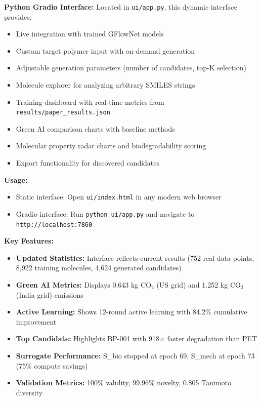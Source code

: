 \documentclass[twocolumn,10pt]{article}
\begin{document}
\textbf{Python Gradio Interface:} Located in \texttt{ui/app.py}, this dynamic interface provides:
\begin{itemize}[noitemsep,leftmargin=*]
\item Live integration with trained GFlowNet models
\item Custom target polymer input with on-demand generation
\item Adjustable generation parameters (number of candidates, top-K selection)
\item Molecule explorer for analyzing arbitrary SMILES strings
\item Training dashboard with real-time metrics from \texttt{results/paper\_results.json}
\item Green AI comparison charts with baseline methods
\item Molecular property radar charts and biodegradability scoring
\item Export functionality for discovered candidates
\end{itemize}

\textbf{Usage:}
\begin{itemize}[noitemsep,leftmargin=*]
\item Static interface: Open \texttt{ui/index.html} in any modern web browser
\item Gradio interface: Run \texttt{python ui/app.py} and navigate to \texttt{http://localhost:7860}
\end{itemize}

\textbf{Key Features:}
\begin{itemize}[noitemsep,leftmargin=*]
\item \textbf{Updated Statistics:} Interface reflects current results (752 real data points, 8,922 training molecules, 4,624 generated candidates)
\item \textbf{Green AI Metrics:} Displays 0.643 kg CO$_2$ (US grid) and 1.252 kg CO$_2$ (India grid) emissions
\item \textbf{Active Learning:} Shows 12-round active learning with 84.2\% cumulative improvement
\item \textbf{Top Candidate:} Highlights BP-001 with 918× faster degradation than PET
\item \textbf{Surrogate Performance:} S\_bio stopped at epoch 69, S\_mech at epoch 73 (75\% compute savings)
\item \textbf{Validation Metrics:} 100\% validity, 99.96\% novelty, 0.805 Tanimoto diversity
\end{itemize}
\end{document}
